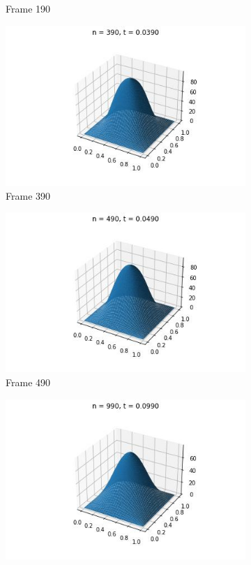 \documentclass{article}
\begin{document}
\begin{figure} [H]
\begin{subfigure}{0.3\linewidth}
    \caption{Frame 190}
  \end{subfigure}
  \begin{subfigure}{0.3\linewidth}
    \centering
    \includegraphics[width=\linewidth]{Cuadrada/3D/390.jpg}
    \caption{Frame 390}
  \end{subfigure}
    \begin{subfigure}{0.3\linewidth}
    \centering
    \includegraphics[width=\linewidth]{Cuadrada/3D/490.jpg}
    \caption{Frame 490}
  \end{subfigure}
      \begin{subfigure}{0.3\linewidth}
    \centering
    \includegraphics[width=\linewidth]{Cuadrada/3D/990.jpg}

\end{subfigure}
\end{figure}
\end{document}
